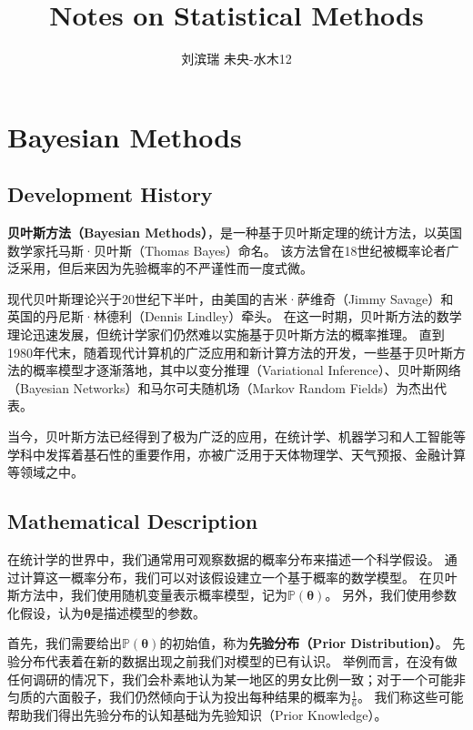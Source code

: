 \documentclass[12pt, a4paper]{article}
\title{{\Huge{\textbf{Notes on Statistical Methods \\}}}}
\author{刘滨瑞 \quad 2021012579 \quad 未央-水木12}
\newcommand{\prob}{{\mathbb{P}}}
\begin{document}
\maketitle

    \section{Bayesian Methods}

    \subsection{Development History}

        \textbf{贝叶斯方法（Bayesian Methods）}，是一种基于贝叶斯定理的统计方法，以英国数学家托马斯·贝叶斯（Thomas Bayes）命名。
        该方法曾在18世纪被概率论者广泛采用，但后来因为先验概率的不严谨性而一度式微。

        现代贝叶斯理论兴于20世纪下半叶，由美国的吉米·萨维奇（Jimmy Savage）和英国的丹尼斯·林德利（Dennis Lindley）牵头。
        在这一时期，贝叶斯方法的数学理论迅速发展，但统计学家们仍然难以实施基于贝叶斯方法的概率推理。
        直到1980年代末，随着现代计算机的广泛应用和新计算方法的开发，一些基于贝叶斯方法的概率模型才逐渐落地，其中以变分推理（Variational Inference）、贝叶斯网络（Bayesian Networks）和马尔可夫随机场（Markov Random Fields）为杰出代表。

        当今，贝叶斯方法已经得到了极为广泛的应用，在统计学、机器学习和人工智能等学科中发挥着基石性的重要作用，亦被广泛用于天体物理学、天气预报、金融计算等领域之中。

    \subsection{Mathematical Description}

        在统计学的世界中，我们通常用可观察数据的概率分布来描述一个科学假设。
        通过计算这一概率分布，我们可以对该假设建立一个基于概率的数学模型。
        在贝叶斯方法中，我们使用随机变量表示概率模型，记为$\prob (\bm{\theta})$。
        另外，我们使用参数化假设，认为$\bm{\theta}$是描述模型的参数。

        首先，我们需要给出$\prob (\bm{\theta})$的初始值，称为\textbf{先验分布（Prior Distribution）}。
        先验分布代表着在新的数据出现之前我们对模型的已有认识。
        举例而言，在没有做任何调研的情况下，我们会朴素地认为某一地区的男女比例一致；对于一个可能非匀质的六面骰子，我们仍然倾向于认为投出每种结果的概率为$\frac{1}{6}$。
        我们称这些可能帮助我们得出先验分布的认知基础为先验知识（Prior Knowledge）。
\end{document}
